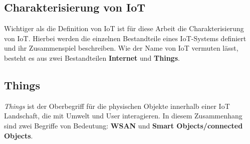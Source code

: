 \subsection{Charakterisierung von IoT}\label{subsec:characIot}
Wichtiger als die Definition von \ac{IoT} ist für diese Arbeit die Charakterisierung von \ac{IoT}. Hierbei werden die einzelnen Bestandteile eines \ac{IoT}-Systems definiert und ihr Zusammenspiel beschreiben. Wie der Name von \acl{IoT} vermuten lässt, besteht es aus zwei Bestandteilen \textbf{Internet} und \textbf{Things}.

\subsection{Things}
\textit{Things} ist der Oberbegriff für die physischen Objekte innerhalb einer \ac{IoT} Landschaft, die mit Umwelt und User interagieren. In diesem Zusammenhang sind zwei Begriffe von Bedeutung: \textbf{\ac{WSAN}} und \textbf{Smart Objects/connected Objects}.

